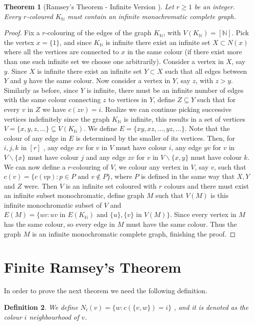 \documentclass[12pt,twoside,a4paper,bibliography=totocnumbered]{book}
\numberwithin{equation}{section}
\let\setminus=\smallsetminus
\newtheorem{theorem}             {Theorem}[section]
\newtheorem{definition}	[theorem] {Definition}
\theoremstyle{remark}
\begin{document}
\begin{theorem}[{Ramsey's Theorem - Infinite Version \cite{Ra29}}]\label{thm:RamseyTheorem}
Let $r \geq 1$ be an integer. Every $r$-coloured $K_{\mathbb{N}}$ must contain an infinite monochromatic complete graph.
\end{theorem}
\begin{proof}
Fix a $r$-colouring of the edges of the graph $K_{\mathbb{N}}$, with $V(K_{\mathbb{N}}) = [\mathbb{N}]$. Pick the vertex $x = \{1\}$, and since $K_{\mathbb{N}}$ is infinite there exist an infinite set $X \subset N(x)$ where all the vertices are connected to $x$ in the same colour (if there exist more than one such infinite set we choose one arbitrarily). Consider a vertex in $X$, say $y$. Since $X$ is infinite there exist an infinite set $Y \subset X$ such that all edges between $Y$ and $y$ have the same colour. Now consider a vertex in $Y$, say $z$, with $z > y$. Similarly as before, since $Y$ is infinite, there must be an infinite number of edges with the same colour connecting $z$ to vertices in $Y$, define $Z \subseteq Y$ such that for every $v$ in $Z$ we have $c(zv) = i$.
Realize we can continue picking successive vertices indefinitely since the graph $K_{\mathbb{N}}$ is infinite, this results in a set of vertices $V = \{x,y,z,\ldots\} \subseteq V(K_{\mathbb{N}})$. We define $E =\{xy,xz,\ldots,yz,\ldots\}$. Note that the colour of any edge in $E$ is determined by the smaller  of its vertices. Then, for $i,j,k$ in $[r]$ , any edge $xv$ for $v$ in $V$ must have colour $i$, any edge $yv$ for $v$ in $V\setminus \{x\}$ must have colour $j$ and any edge $zv$ for $v$ in $V\setminus \{x,y\}$ must have colour $k$. We can now define a $r$-colouring of $V$, we colour any vertex in $V$, say $v$, such that $c(v) = \{c(vp)\colon p \in P\text{ and } v \notin P \}$, where $P$ is defined in the same way that $X,Y$ and $Z$ were. Then $V$ is an infinite set coloured with $r$ colours and there must exist an infinite subset monochromatic, define graph $M$ such that $V(M)$ is this infinite monochromatic subset of $V$ and $E(M) = \{uv \colon uv \text{ in } E(K_{\mathbb{N}}) \text{ and } \{u\},\{v\} \text{ in } V(M) \}$. Since every vertex in $M$ has the same colour, so every edge in $M$ must have the same colour. Thus the graph $M$ is an infinite monochromatic complete graph, finishing the proof.
\end{proof}

\section{Finite Ramsey's Theorem}
In order to prove the next theorem we need the following definition.
\begin{definition}
We define $N_i(v) =\{ w\colon c(\{v,w\})=i\}$ , and it is denoted as the colour $i$ neighbourhood of $v$.
\end{definition}
\end{document}
